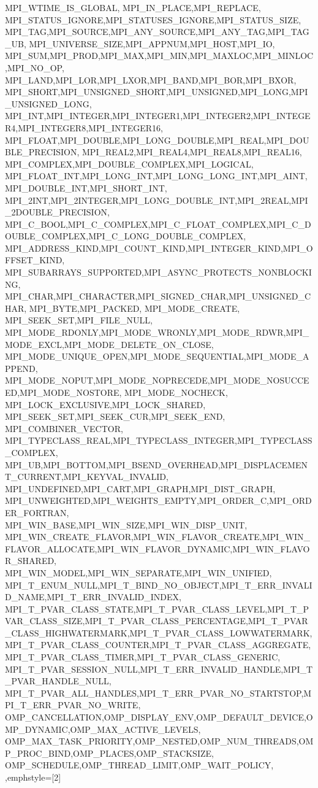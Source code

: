 {{{{{    MPI_WTIME_IS_GLOBAL, MPI_IN_PLACE,MPI_REPLACE,
    MPI_STATUS_IGNORE,MPI_STATUSES_IGNORE,MPI_STATUS_SIZE,
    MPI_TAG,MPI_SOURCE,MPI_ANY_SOURCE,MPI_ANY_TAG,MPI_TAG_UB,
    MPI_UNIVERSE_SIZE,MPI_APPNUM,MPI_HOST,MPI_IO,
    MPI_SUM,MPI_PROD,MPI_MAX,MPI_MIN,MPI_MAXLOC,MPI_MINLOC,MPI_NO_OP,
    MPI_LAND,MPI_LOR,MPI_LXOR,MPI_BAND,MPI_BOR,MPI_BXOR,
    MPI_SHORT,MPI_UNSIGNED_SHORT,MPI_UNSIGNED,MPI_LONG,MPI_UNSIGNED_LONG,
    MPI_INT,MPI_INTEGER,MPI_INTEGER1,MPI_INTEGER2,MPI_INTEGER4,MPI_INTEGER8,MPI_INTEGER16,
    MPI_FLOAT,MPI_DOUBLE,MPI_LONG_DOUBLE,MPI_REAL,MPI_DOUBLE_PRECISION,
    MPI_REAL2,MPI_REAL4,MPI_REAL8,MPI_REAL16,
    MPI_COMPLEX,MPI_DOUBLE_COMPLEX,MPI_LOGICAL,
    MPI_FLOAT_INT,MPI_LONG_INT,MPI_LONG_LONG_INT,MPI_AINT,MPI_DOUBLE_INT,MPI_SHORT_INT,
    MPI_2INT,MPI_2INTEGER,MPI_LONG_DOUBLE_INT,MPI_2REAL,MPI_2DOUBLE_PRECISION,
    MPI_C_BOOL,MPI_C_COMPLEX,MPI_C_FLOAT_COMPLEX,MPI_C_DOUBLE_COMPLEX,MPI_C_LONG_DOUBLE_COMPLEX,
    MPI_ADDRESS_KIND,MPI_COUNT_KIND,MPI_INTEGER_KIND,MPI_OFFSET_KIND,
    MPI_SUBARRAYS_SUPPORTED,MPI_ASYNC_PROTECTS_NONBLOCKING,
    MPI_CHAR,MPI_CHARACTER,MPI_SIGNED_CHAR,MPI_UNSIGNED_CHAR,
    MPI_BYTE,MPI_PACKED, MPI_MODE_CREATE,
    MPI_SEEK_SET,MPI_FILE_NULL,
    MPI_MODE_RDONLY,MPI_MODE_WRONLY,MPI_MODE_RDWR,MPI_MODE_EXCL,MPI_MODE_DELETE_ON_CLOSE,
    MPI_MODE_UNIQUE_OPEN,MPI_MODE_SEQUENTIAL,MPI_MODE_APPEND,
    MPI_MODE_NOPUT,MPI_MODE_NOPRECEDE,MPI_MODE_NOSUCCEED,MPI_MODE_NOSTORE,
    MPI_MODE_NOCHECK, MPI_LOCK_EXCLUSIVE,MPI_LOCK_SHARED,
    MPI_SEEK_SET,MPI_SEEK_CUR,MPI_SEEK_END,
    MPI_COMBINER_VECTOR,
    MPI_TYPECLASS_REAL,MPI_TYPECLASS_INTEGER,MPI_TYPECLASS_COMPLEX,
    MPI_UB,MPI_BOTTOM,MPI_BSEND_OVERHEAD,MPI_DISPLACEMENT_CURRENT,MPI_KEYVAL_INVALID,
    MPI_UNDEFINED,MPI_CART,MPI_GRAPH,MPI_DIST_GRAPH,
    MPI_UNWEIGHTED,MPI_WEIGHTS_EMPTY,MPI_ORDER_C,MPI_ORDER_FORTRAN,
    MPI_WIN_BASE,MPI_WIN_SIZE,MPI_WIN_DISP_UNIT,
    MPI_WIN_CREATE_FLAVOR,MPI_WIN_FLAVOR_CREATE,MPI_WIN_FLAVOR_ALLOCATE,MPI_WIN_FLAVOR_DYNAMIC,MPI_WIN_FLAVOR_SHARED,
    MPI_WIN_MODEL,MPI_WIN_SEPARATE,MPI_WIN_UNIFIED,
    MPI_T_ENUM_NULL,MPI_T_BIND_NO_OBJECT,MPI_T_ERR_INVALID_NAME,MPI_T_ERR_INVALID_INDEX,
    MPI_T_PVAR_CLASS_STATE,MPI_T_PVAR_CLASS_LEVEL,MPI_T_PVAR_CLASS_SIZE,MPI_T_PVAR_CLASS_PERCENTAGE,MPI_T_PVAR_CLASS_HIGHWATERMARK,MPI_T_PVAR_CLASS_LOWWATERMARK,MPI_T_PVAR_CLASS_COUNTER,MPI_T_PVAR_CLASS_AGGREGATE,MPI_T_PVAR_CLASS_TIMER,MPI_T_PVAR_CLASS_GENERIC,
    MPI_T_PVAR_SESSION_NULL,MPI_T_ERR_INVALID_HANDLE,MPI_T_PVAR_HANDLE_NULL,
    MPI_T_PVAR_ALL_HANDLES,MPI_T_ERR_PVAR_NO_STARTSTOP,MPI_T_ERR_PVAR_NO_WRITE,
    OMP_CANCELLATION,OMP_DISPLAY_ENV,OMP_DEFAULT_DEVICE,OMP_DYNAMIC,OMP_MAX_ACTIVE_LEVELS,
    OMP_MAX_TASK_PRIORITY,OMP_NESTED,OMP_NUM_THREADS,OMP_PROC_BIND,OMP_PLACES,OMP_STACKSIZE,
    OMP_SCHEDULE,OMP_THREAD_LIMIT,OMP_WAIT_POLICY,
  },emphstyle={[2]\color{green!40!black}}
}

}}}
